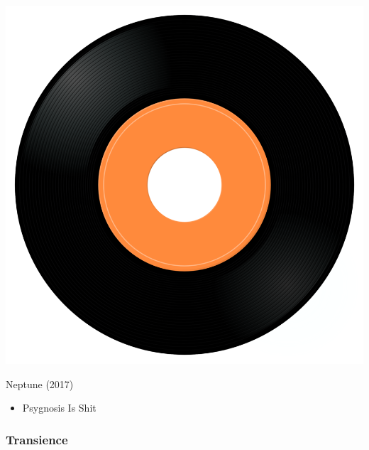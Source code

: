 \begin{minipage}[t]{0.25\textwidth}\vspace{0pt}
\captionsetup{type=figure}
\includegraphics[width=\textwidth]{Images/cover.png}
\caption*{Neptune (2017)}
\end{minipage}
\begin{minipage}[t]{0.25\textwidth}\vspace{0pt}
\begin{itemize}[nosep,leftmargin=1em,labelwidth=*,align=left]
	\setlength{\itemsep}{0pt}
	\item Psygnosis Is Shit
\end{itemize}
\end{minipage}

\subsubsection{Transience}

